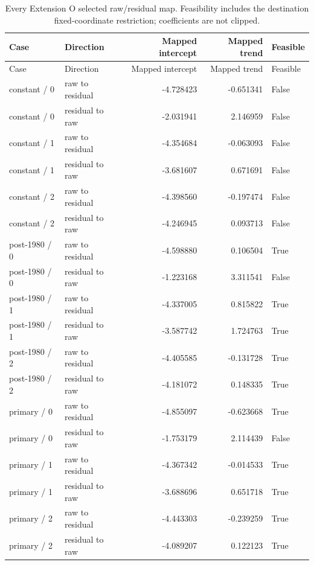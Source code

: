{\small
\setlength{\tabcolsep}{3pt}
\begin{longtable}{llrrl}
\caption{Every Extension O selected raw/residual map. Feasibility includes the destination fixed-coordinate restriction; coefficients are not clipped.}\label{tab:o-feasibility}\\
\toprule
Case & Direction & Mapped intercept & Mapped trend & Feasible\\\midrule
\endfirsthead
\toprule
Case & Direction & Mapped intercept & Mapped trend & Feasible\\\midrule
\endhead
constant / 0 & raw to residual & -4.728423 & -0.651341 & False\\
constant / 0 & residual to raw & -2.031941 & 2.146959 & False\\
constant / 1 & raw to residual & -4.354684 & -0.063093 & False\\
constant / 1 & residual to raw & -3.681607 & 0.671691 & False\\
constant / 2 & raw to residual & -4.398560 & -0.197474 & False\\
constant / 2 & residual to raw & -4.246945 & 0.093713 & False\\
post-1980 / 0 & raw to residual & -4.598880 & 0.106504 & True\\
post-1980 / 0 & residual to raw & -1.223168 & 3.311541 & False\\
post-1980 / 1 & raw to residual & -4.337005 & 0.815822 & True\\
post-1980 / 1 & residual to raw & -3.587742 & 1.724763 & True\\
post-1980 / 2 & raw to residual & -4.405585 & -0.131728 & True\\
post-1980 / 2 & residual to raw & -4.181072 & 0.148335 & True\\
primary / 0 & raw to residual & -4.855097 & -0.623668 & True\\
primary / 0 & residual to raw & -1.753179 & 2.114439 & False\\
primary / 1 & raw to residual & -4.367342 & -0.014533 & True\\
primary / 1 & residual to raw & -3.688696 & 0.651718 & True\\
primary / 2 & raw to residual & -4.443303 & -0.239259 & True\\
primary / 2 & residual to raw & -4.089207 & 0.122123 & True\\
\bottomrule
\end{longtable}
}

